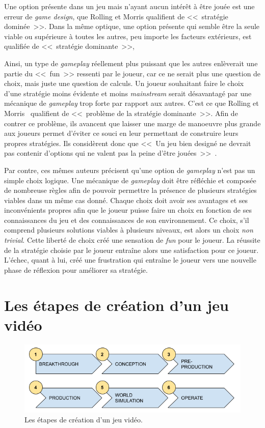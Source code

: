 Une option présente dans un jeu mais n'ayant aucun intérêt \`a être jouée est une erreur de \emph{game design}, que Rolling et Morris qualifient de <<~stratégie dominée~>>. 
Dans la même optique, une option présente qui semble être la seule viable ou supérieure à toutes les autres, peu importe les facteurs extérieurs, est qualifiée de <<~stratégie dominante~>>,

Ainsi, un type de \emph{gameplay} réellement plus puissant que les autres enlèverait une partie du <<~fun~>> ressenti par le joueur, car ce ne serait plus une question de choix, mais juste une question de calculs.
Un joueur souhaitant faire le choix d'une stratégie moins évidente et moins \emph{mainstream} serait désavantagé par une mécanique de \emph{gameplay} trop forte par rapport aux autres.
C'est ce que Rolling et Morris~\cite{Rollings2004} qualifient de <<~problème de la stratégie dominante~>>. 
Afin de contrer ce problème, ils avancent que laisser une marge de manoeuvre plus grande aux joueurs permet d'éviter ce souci en leur permettant de construire leurs propres stratégies.
Ils considèrent donc que <<~Un jeu bien designé ne devrait pas contenir d'options qui ne valent pas la peine d'être jouées~>>~\cite{Rollings2004}.

Par contre, ces m\^emes auteurs précisent qu'une option de \emph{gameplay} n'est pas un simple choix logique.
Une mécanique de \emph{gameplay} doit être réfléchie et composée de nombreuse règles afin de pouvoir permettre la présence de plusieurs stratégies viables dans un même cas donné.
%
Chaque choix doit avoir ses avantages et ses inconvénients propres afin que le joueur puisse faire un choix en fonction de ses connaissances du jeu et des connaissances de son environnement.
Ce choix, s'il comprend plusieurs solutions viables à plusieurs niveaux, est alors un choix \emph{non trivial}.
Cette liberté de choix créé une sensation de \emph{fun} pour le joueur.
%
La réussite de la stratégie choisie par le joueur entraîne alors une satisfaction pour ce joueur.
L'échec, quant à lui, créé une frustration qui entraîne le joueur vers une nouvelle phase de réflexion pour améliorer sa stratégie.


\section{Les étapes de création d'un jeu vid\'eo}
\label{prob.etapes}
\begin{figure}[H]
    \centering
    \includegraphics[width=14cm]{10_img/production_stages.png} 
    \caption{Les étapes de création d'un jeu vidéo.}
    \label{fig.etapes}
\end{figure}

